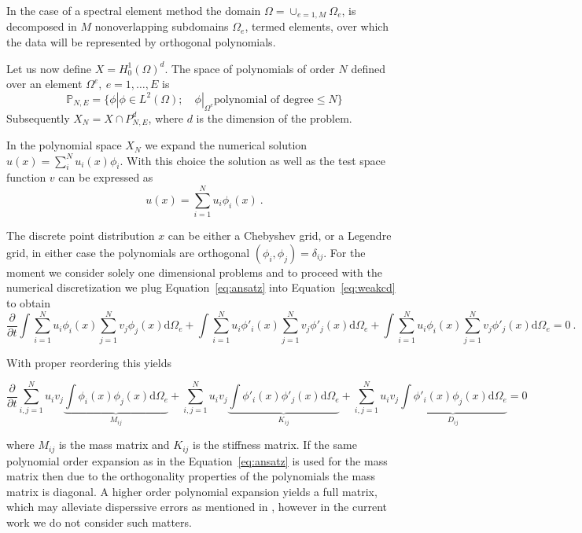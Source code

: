 \documentclass[10pt]{article}
\renewcommand{\d}{\mathrm{d}}
\begin{document}
{In the case of a spectral element method the domain $\Omega=\cup_{e=1,M} \Omega_e $, is decomposed in $M$ nonoverlapping 
subdomains $\Omega_e$, termed elements, over which the data will be represented by orthogonal polynomials.

Let us now define $X=H^1_0(\Omega)^d$. The space of polynomials of order $N$ defined over an element $\Omega^e, \ e=1,\ldots, E$ is
$$
\mathbb P_{N,E}=\lbrace  \phi| \phi \in L^2(\Omega); \quad \phi|_{\Omega^e} \text{polynomial of degree} \leq N\rbrace
$$
Subsequently $X_N=X\cap  P_{N,E}^d$, where $d$ is the dimension of the problem.

In the polynomial space $X_N$ we expand the numerical solution $u(x)=\sum_i^N u_i(x)\phi_i$.
With this choice the solution as well as the test space function $v$ can be expressed as
\begin{equation}
u( x)=\sum_{i=1}^N u_{i}\phi_i( x)\ .
\label{eq:ansatz}
\end{equation}

The discrete point distribution $ x$ can be either a Chebyshev grid, or a Legendre grid, in either case the polynomials are orthogonal $(\phi_i, \phi_j)=\delta_{ij}$. 
For the moment we consider solely one dimensional problems and to proceed with the numerical discretization we plug Equation~\ref{eq:ansatz} into Equation~\ref{eq:weakcd} to obtain
\begin{equation}
\frac{\partial}{\partial t}\int \sum_{i=1}^N u_{i}\phi_i(x) \sum_{j=1}^N v_{j}\phi_j(x) \d \Omega_e + \int\sum_{i=1}^N u_{i}\phi'_i(x) \sum_{j=1}^N v_{j}\phi'_j(x) \d \Omega_e  +\int\sum_{i=1}^N u_{i}\phi_i(x) \sum_{j=1}^N v_{j}\phi'_j(x) \d \Omega_e =0 \ .
\end{equation}

With proper reordering this yields

\begin{equation}
\frac{\partial}{\partial t}\sum_{i,j=1}^N u_{i}v_{j}\underbrace{\int \phi_i(x)\phi_j(x) \d \Omega_e}_{M_{ij}} + \sum_{i,j=1}^N u_{i} v_{j}\underbrace{\int\phi'_i(x) \phi'_j(x) \d \Omega_e}_{K_{ij}} +\sum_{i,j=1}^N u_{i} v_{j}\underbrace{\int\phi'_i(x) \phi_j(x) \d \Omega_e}_{D_{ij}}  =0
\end{equation}

where $M_{ij}$ is the mass matrix and $K_{ij}$ is the stiffness matrix. If the same polynomial order expansion as in the Equation~\ref{eq:ansatz} is used for the mass matrix then due to the orthogonality properties of the polynomials the mass matrix is diagonal. A higher order polynomial expansion yields a full matrix, which may alleviate disperssive errors as mentioned in \cite{ainsworth2014}, however in the current work we do not consider such matters.

}
\end{document}
